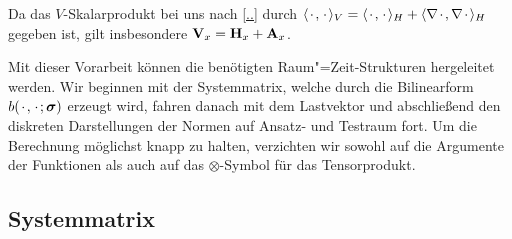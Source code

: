 \documentclass[../main.tex]{subfiles}
\begin{document}
Da das $V$-Skalarprodukt bei uns nach \cref{..} durch $\langle{\mkern2mu\cdot\mkern2mu},{\mkern2mu\cdot\mkern2mu}\rangle_{V} = \langle{\mkern2mu\cdot\mkern2mu},{\mkern2mu\cdot\mkern2mu}\rangle_{H} + \langle\nabla{\mkern2mu\cdot\mkern2mu},\nabla{\mkern2mu\cdot\mkern2mu}\rangle_{H}$ gegeben ist, gilt insbesondere $\mathbf{V}_{x} = \mathbf{H}_{x} + \mathbf{A}_{x}$.

Mit dieser Vorarbeit können die benötigten Raum"=Zeit-Strukturen hergeleitet werden.
Wir beginnen mit der Systemmatrix, welche durch die Bilinearform $b({\mkern2mu\cdot\mkern2mu}, {\mkern2mu\cdot\mkern2mu}; \bm \sigma)$ erzeugt wird, fahren danach mit dem Lastvektor und abschließend den diskreten Darstellungen der Normen auf Ansatz- und Testraum fort.
Um die Berechnung möglichst knapp zu halten, verzichten wir sowohl auf die Argumente der Funktionen als auch auf das $\otimes$-Symbol für das Tensorprodukt.

\subsection*{Systemmatrix}
\end{document}
